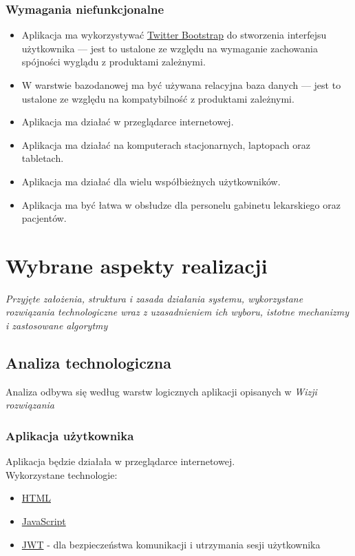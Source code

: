 \documentclass[polish,12pt]{aghthesis}
\begin{document}
\subsubsection{Wymagania niefunkcjonalne}
\begin{itemize}
    \item Aplikacja ma wykorzystywać \href{https://getbootstrap.com/}{Twitter Bootstrap} do stworzenia interfejsu użytkownika --- jest to ustalone ze względu na wymaganie zachowania spójności wyglądu z produktami zależnymi.
    \item W warstwie bazodanowej ma być używana relacyjna baza danych --- jest to ustalone ze względu na kompatybilność z produktami zależnymi.
    \item Aplikacja ma działać w przeglądarce internetowej.
    \item Aplikacja ma działać na komputerach stacjonarnych, laptopach oraz tabletach.
    \item Aplikacja ma działać dla wielu współbieżnych użytkowników.
    \item Aplikacja ma być łatwa w obsłudze dla personelu gabinetu lekarskiego oraz pacjentów.
\end{itemize}


\section{Wybrane aspekty realizacji}
\label{sec:wybrane-aspekty-realizacji}

\emph{Przyjęte założenia, struktura i zasada działania systemu,
  wykorzystane rozwiązania technologiczne wraz z uzasadnieniem
  ich wyboru, istotne mechanizmy i zastosowane algorytmy}

\subsection{Analiza technologiczna}
\label{subsec:analizaTechnologiczna}
Analiza odbywa się według warstw logicznych aplikacji opisanych w \emph{Wizji rozwiązania}

\subsubsection{Aplikacja użytkownika}
Aplikacja będzie działała w przeglądarce internetowej. \\
Wykorzystane technologie:
\begin{itemize}
  \item \href{https://pl.wikipedia.org/wiki/HTML}{HTML}
  \item \href{https://pl.wikipedia.org/wiki/JavaScript}{JavaScript}
  \item \href{https://jwt.io/}{JWT} - dla bezpieczeństwa komunikacji i utrzymania sesji użytkownika
\end{itemize}
\end{document}

